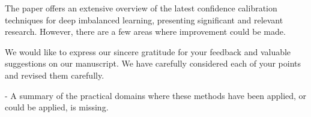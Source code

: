 
\reviewer

\begin{generalcomment}
The paper offers an extensive overview of the latest confidence calibration techniques for deep imbalanced learning, presenting significant and relevant research. However, there are a few areas where improvement could be made.
\end{generalcomment}
\begin{revmeta}[]
We would like to express our sincere gratitude for your feedback and valuable suggestions on our manuscript. We have carefully considered each of your points and revised them carefully.
\end{revmeta}

\begin{revcomment}
- A summary of the practical domains where these methods have been applied, or could be applied, is missing.
\end{revcomment}
